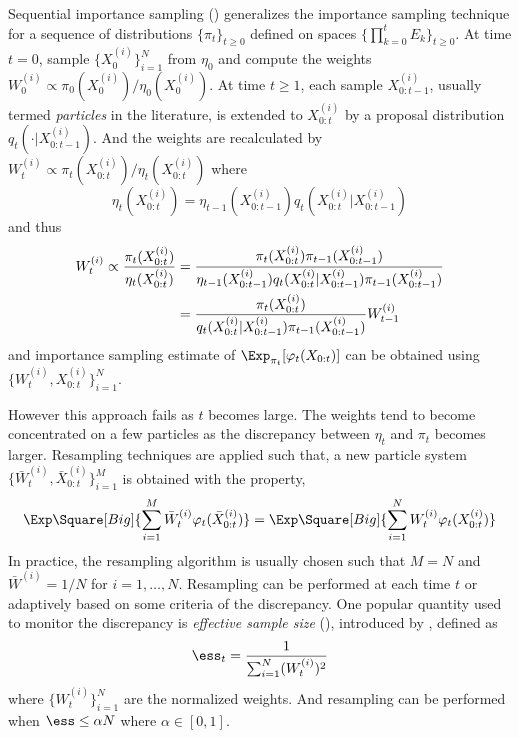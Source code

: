 \documentclass[11pt,bib,mint,hyper,altcolor]{marticle}
\begin{document}
Sequential importance sampling (\sis) generalizes the importance sampling
technique for a sequence of distributions $\{\pi_t\}_{t\ge0}$ defined on spaces
$\{\prod_{k=0}^tE_k\}_{t\ge0}$. At time $t = 0$, sample $\{X_0^{(i)}\}_{i=1}^N$
from $\eta_0$ and compute the weights $W_0^{(i)} \propto
\pi_0(X_0^{(i)})/\eta_0(X_0^{(i)})$. At time $t\ge1$, each sample
$X_{0:t-1}^{(i)}$, usually termed \emph{particles} in the literature, is
extended to $X_{0:t}^{(i)}$ by a proposal distribution
$q_t(\cdot|X_{0:t-1}^{(i)})$. And the weights are recalculated by $W_t^{(i)}
\propto \pi_t(X_{0:t}^{(i)})/\eta_t(X_{0:t}^{(i)})$ where
\begin{equation}
  \eta_t(X_{0:t}^{(i)}) =
  \eta_{t-1}(X_{0:t-1}^{(i)})q_t(X_{0:t}^{(i)}|X_{0:t-1}^{(i)})
\end{equation}
and thus
\begin{align}
  W_t^{(i)} \propto \frac{\pi_t(X_{0:t}^{(i)})}{\eta_t(X_{0:t}^{(i)})}
  &= \frac{\pi_t(X_{0:t}^{(i)})\pi_{t-1}(X_{0:t-1}^{(i)})}
  {\eta_{t-1}(X_{0:t-1}^{(i)})q_t(X_{0:t}^{(i)}|X_{0:t-1}^{(i)})
    \pi_{t-1}(X_{0:t-1}^{(i)})} \notag\\
  &= \frac{\pi_t(X_{0:t}^{(i)})}
  {q_t(X_{0:t}^{(i)}|X_{0:t-1}^{(i)})\pi_{t-1}(X_{0:t-1}^{(i)})}W_{t-1}^{(i)}
  \label{eq:si}
\end{align}
and importance sampling estimate of $\Exp_{\pi_t}[\varphi_t(X_{0:t})]$ can be
obtained using $\{W_t^{(i)},X_{0:t}^{(i)}\}_{i=1}^N$.

However this approach fails as $t$ becomes large. The weights tend to become
concentrated on a few particles as the discrepancy between $\eta_t$ and $\pi_t$
becomes larger. Resampling techniques are applied such that, a new particle
system $\{\bar{W}_t^{(i)},\bar{X}_{0:t}^{(i)}\}_{i=1}^M$ is obtained with the
property,
\begin{equation}
  \Exp\Square[Big]{\sum_{i=1}^M\bar{W}_t^{(i)}\varphi_t(\bar{X}_{0:t}^{(i)})} =
  \Exp\Square[Big]{\sum_{i=1}^NW_t^{(i)}\varphi_t(X_{0:t}^{(i)})}
  \label{eq:resample}
\end{equation}
In practice, the resampling algorithm is usually chosen such that $M = N$ and
$\bar{W}^{(i)} = 1/N$ for $i=1,\dots,N$. Resampling can be performed at each
time $t$ or adaptively based on some criteria of the discrepancy. One popular
quantity used to monitor the discrepancy is \emph{effective sample size}
(\ess), introduced by \textcite{Liu:1998iu}, defined as
\begin{equation}
  \ess_t = \frac{1}{\sum_{i=1}^N (W_t^{(i)})^2}
\end{equation}
where $\{W_t^{(i)}\}_{i=1}^N$ are the normalized weights. And resampling can be
performed when $\ess\le \alpha N$ where $\alpha\in[0,1]$.
\end{document}
